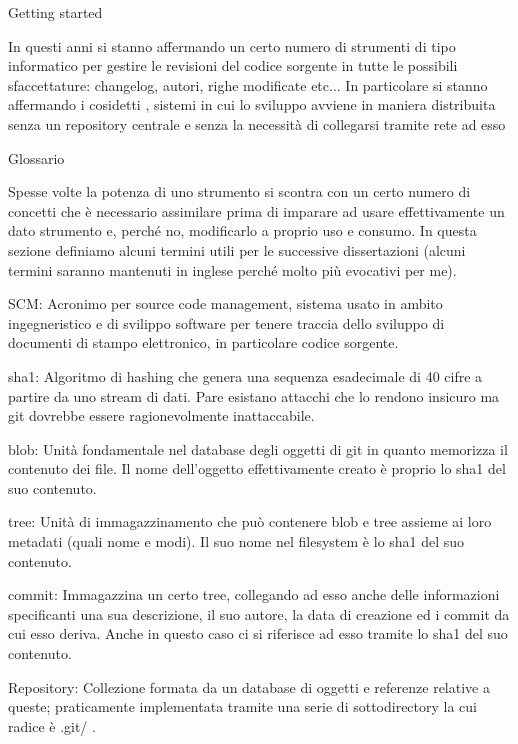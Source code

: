 \capitolo Getting started

In questi anni si stanno affermando un certo numero di strumenti di tipo
informatico per gestire le revisioni del codice sorgente in tutte le possibili
sfaccettature: changelog, autori, righe modificate etc... In particolare si
stanno affermando i cosidetti , sistemi
in cui lo sviluppo avviene in maniera distribuita senza un repository centrale e
senza la necessit\`a di collegarsi tramite rete ad esso

\sezione Glossario

Spesse volte la potenza di uno strumento si scontra con un certo numero di
concetti che \`e necessario assimilare prima di imparare ad usare
effettivamente un dato strumento e, perch\'e no, modificarlo a proprio uso e
consumo. In questa sezione definiamo alcuni termini utili per le successive
dissertazioni (alcuni termini saranno mantenuti in inglese perch\'e molto pi\`u
evocativi per me).
\medskip

\elemento SCM: Acronimo per source code management, sistema usato in ambito
ingegneristico e di svilippo software per tenere traccia dello sviluppo di
documenti di stampo elettronico, in particolare codice sorgente.

\elemento sha1: Algoritmo di hashing che genera una sequenza esadecimale di 40
cifre a partire da uno stream di dati. Pare esistano attacchi che lo rendono
insicuro ma git dovrebbe essere ragionevolmente inattaccabile.

\elemento blob: Unit\`a fondamentale nel database degli oggetti di git in quanto
memorizza il contenuto dei file. Il nome dell'oggetto effettivamente creato \`e
proprio lo sha1 del suo contenuto.

\elemento tree: Unit\`a di immagazzinamento che pu\`o contenere blob e tree
assieme ai loro metadati (quali nome e modi). Il suo nome nel filesystem \`e lo
sha1 del suo contenuto.

\elemento commit: Immagazzina un certo tree, collegando ad esso anche delle
informazioni specificanti una sua descrizione, il suo autore, la data di
creazione ed i commit da cui esso deriva. Anche in questo caso ci si riferisce
ad esso tramite lo sha1 del suo contenuto.

\elemento Repository: Collezione formata da un database di oggetti e referenze
relative a queste; praticamente implementata tramite una serie di sottodirectory
la cui radice \`e \verbatim .git/ \endverbatim.


